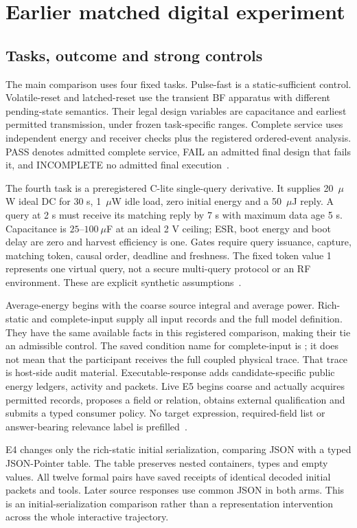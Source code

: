 \section{Earlier matched digital experiment}
\subsection{Tasks, outcome and strong controls}
The main comparison uses four fixed tasks. Pulse-fast is a static-sufficient
control. Volatile-reset and latched-reset use the transient BF apparatus
with different pending-state semantics. Their legal design variables are
capacitance and earliest permitted transmission, under frozen task-specific
ranges. Complete service uses independent energy and receiver checks plus
the registered ordered-event analysis. PASS denotes admitted complete
service, FAIL an admitted final design that fails it, and INCOMPLETE no
admitted final execution~\cite{protocol,comparison}.

The fourth task is a preregistered C-lite single-query derivative. It supplies
20~$\mu$W ideal DC for 30 s, 1~$\mu$W idle load, zero initial energy and
a 50~$\mu$J reply. A query at 2 s must receive its matching reply by 7 s
with maximum data age 5 s. Capacitance is $25$--$100~\mu$F at an ideal
2 V ceiling; ESR, boot energy and boot delay are zero and harvest efficiency
is one. Gates require query issuance, capture, matching token, causal order,
deadline and freshness. The fixed token value 1 represents one virtual
query, not a secure multi-query protocol or an RF environment. These are
explicit synthetic assumptions~\cite{derivative}.

Average-energy begins with the coarse source integral and average power.
Rich-static and complete-input supply all input records and the full
model definition. They have the same available facts in this registered
comparison, making their tie an admissible control. The saved condition
name for complete-input is ; it does not mean that the
participant receives the full coupled physical trace. That trace is
host-side audit material. Executable-response adds candidate-specific
public energy ledgers, activity and packets. Live E5 begins coarse and
actually acquires permitted records, proposes a field or relation, obtains
external qualification and submits a typed consumer policy. No target
expression, required-field list or answer-bearing relevance label is
prefilled~\cite{protocol,tables}.

E4 changes only the rich-static initial serialization, comparing JSON with
a typed JSON-Pointer table. The table preserves nested containers, types
and empty values. All twelve formal pairs have saved receipts of identical
decoded initial packets and tools. Later source responses use common JSON
in both arms. This is an initial-serialization comparison rather than a
representation intervention across the whole interactive trajectory.

